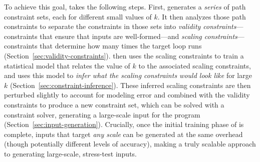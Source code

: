 To achieve this goal, \lancet takes the following steps. First, \lancet generates a {\em series} of path constraint sets, each for different small values of $k$. It then analyzes those path constraints to separate the constraints in those sets into {\em validity constraints}---constraints that ensure that inputs are well-formed---and {\em scaling constraints}---constraints that determine how many times the target loop runs (Section~\ref{sec:validity-constraints}). \lancet then uses the scaling constraints to train a statistical model that relates the value of $k$ to the associated scaling constraints, and uses this model to {\em infer what the scaling constraints would look like} for large $k$ (Section~\ref{sec:constraint-inference}). These inferred scaling constraints are then perturbed slightly to account for modeling error and combined with the validity constraints to produce a new constraint set, which can be solved with a constraint solver, generating a large-scale input for the program (Section~\ref{sec:input-generation}). Crucially, once the initial training phase of \lancet is complete, inputs that target {\em any scale} can be generated at the same overhead (though potentially different levels of accuracy), making \lancet a truly scalable approach to generating large-scale, stress-test inputs.

